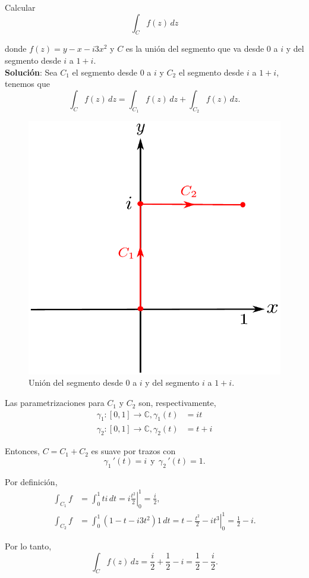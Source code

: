 \begin{ejemplo}
Calcular
$$\int_C f(z) \,dz$$

donde $f(z) = y - x - i3x^2$ y $C$ es la unión del segmento que va desde 0 a $i$ y del segmento desde $i$ a $1+i$.
\\

\textbf{Solución}:  Sea $C_1$ el segmento desde $0$ a $i$ y $C_2$ el segmento desde $i$ a $1+i$, tenemos que
$$\int_C f(z) \,dz = \int_{C_1} f(z) \,dz + \int_{C_2} f(z) \,dz.$$

\begin{figure}[H]
    \centering
    \includegraphics[scale = 0.5]{Figuras/Integral2.pdf}
    \caption{Unión del segmento desde $0$ a $i$ y del segmento $i$ a $1+i$.}
    \label{fig:IntegralLinea2}
\end{figure}

Las parametrizaciones para $C_1$ y $C_2$ son, respectivamente,
\begin{align*}
\gamma_1: [0,1] \longrightarrow \mathbb{C}, \gamma_1(t) &= it \\
\gamma_2: [0,1] \longrightarrow \mathbb{C}, \gamma_2(t) &= t + i
\end{align*}

Entonces, $C = C_1 + C_2$ es suave por trazos con 
$$\gamma_1\,'(t) = i ~~\mbox{y}~~ \gamma_2\,'(t) = 1.$$

Por definición,
\begin{align*}
\int_{C_1} f &= \int_0^1 t i \,dt = \left. i \frac{t^2}{2} \right|_0^1 = \frac{i}{2}, \\
\int_{C_2} f &= \int_0^1 (1-t-i3t^2) 1 \,dt = \left. t - \frac{t^2}{2} - it^3 \right|_0^1 = \frac{1}{2} - i.
\end{align*}

Por lo tanto, 
$$\int_C f(z) \,dz = \frac{i}{2} + \frac{1}{2} - i = \frac{1}{2} - \frac{i}{2}.$$
\end{ejemplo}

